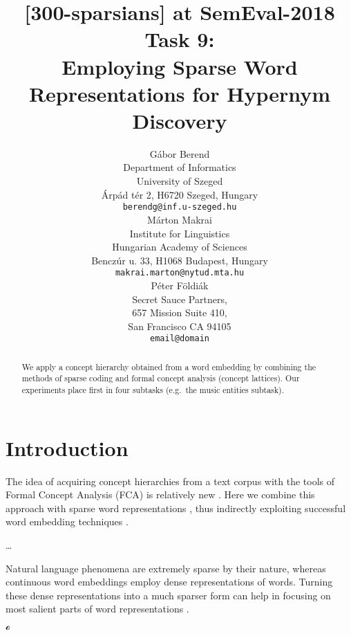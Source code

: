 \documentclass[11pt,a4paper]{article}
\title{[300-sparsians] at SemEval-2018 Task 9: \\ 
Employing Sparse Word Representations for Hypernym Discovery}
\author{Gábor Berend \\
Department of Informatics \\ University of Szeged \\
Árpád tér 2, H6720 Szeged, Hungary \\
{\tt berendg@inf.u-szeged.hu} \\\And
  Márton Makrai  \\ %
  Institute for Linguistics \\
  Hungarian Academy of Sciences \\
  Benczúr u. 33, H1068 Budapest, Hungary \\
  {\tt makrai.marton@nytud.mta.hu} \\\AND
  Péter Földiák \\
  Secret Sauce Partners, \\
  657 Mission Suite 410, \\ 
  San Francisco CA 94105 \\
  {\tt email@domain} \\} %
\date{}
\begin{document}
\maketitle

\vspace{1cm}

\begin{abstract}
  We apply a concept hierarchy obtained from a word embedding by combining the
  methods of sparse coding and formal concept analysis (concept lattices).
  Our experiments place first in four subtasks (e.g.~the music entities
  subtask).
\end{abstract}

\section{Introduction}

The idea of acquiring concept hierarchies from a text corpus with the tools of
Formal Concept Analysis (FCA) is relatively new \citep{Cimiano:2005}. Here we
combine this approach with sparse word representations \citep{Faruqui:2015},
thus indirectly exploiting successful word embedding techniques
\citep{Mikolov:2013d}.

\dots %

Natural language phenomena are extremely sparse by their nature, whereas
continuous word embeddings employ dense representations of words. Turning
these dense representations into a much sparser form can help in focusing on
most salient parts of word representations \citep{Faruqui:2015,Berend:2016}.

\newcommand{\ob}{\ensuremath{\mathcal O}}
\newcommand{\at}{\ensuremath{\mathcal A}}
\newcommand{\inci}{\ensuremath{\mathcal I}}
\newcommand{\oaconc}{\ensuremath{\langle O, A\rangle}}

\ensuremath{\mathcal o}
\end{document}
